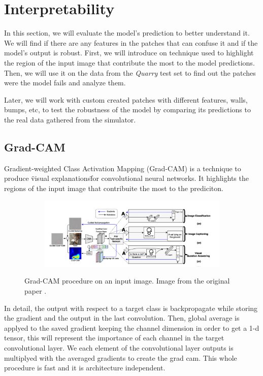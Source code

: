 \documentclass[../document.tex]{subfiles}
\begin{document}
\chapter{Interpretability}
\label{chap: interpretability}
In this section, we will evaluate the model's prediction to better understand it. We will find if there are any features in the patches that can confuse it and if the model's output is robust.
First, we will introduce on technique used to highlight the region of the input image that contribute the most to the model predictions. Then, we will use it on the data from the \emph{Quarry} test set to find out the patches were the model fails and analyze them.

Later, we will work with custom created patches with different features, walls, bumps, etc, to test the robustness of the model by comparing its predictions to the real data gathered from the simulator.

\section{Grad-CAM}
Gradient-weighted Class Activation Mapping (Grad-CAM) \cite{gradcam} is a technique to produce \"visual explanations\" for convolutional neural networks. It highlights the regions of the input image that contribuite the most to the prediciton. 
\begin{figure}[H]
    \centering
    \begin{subfigure}[b]{1\textwidth}
        \includegraphics[width=\linewidth]{../img/5/grad_cam1.png}
    \end{subfigure}
\caption{Grad-CAM procedure on an input image. Image from the original paper \cite{gradcam}.}
\end{figure}
In detail, the output with respect to a target class is backpropagate while storing the gradient and the output in the last convolution. Then, global average is applyed to the saved gradient keeping the channel dimension in order to get a 1-d tensor, this will represent the importance of each channel in the target convolutional layer. We  each element of the convolutional layer outputs is multiplyed with the averaged gradients to create the grad cam. This whole procedure is fast and it is architecture independent.


% 
\end{document}
